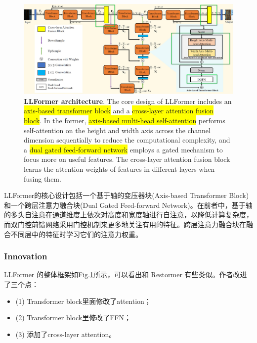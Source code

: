 \documentclass[letterpaper,10pt]{article}
\begin{document}
	\begin{figure}[htbp]
		\centering 
		\includegraphics[width=\columnwidth]{picture/LLFormer_architecture}
		\captionsetup{font=scriptsize}
		\caption{
			\label{fig: LLFormer architecture} %
			\textbf{LLFormer architecture}. The core design of LLFormer includes an \colorbox{yellow}{axis-based transformer block} and a \colorbox{yellow}{cross-layer attention fusion block}. In the former, \colorbox{yellow}{axis-based multi-head self-attention} performs self-attention on the height and width axis across the channel dimension sequentially to reduce the computational complexity, and a \colorbox{yellow}{dual gated feed-forward network} employs a gated mechanism to focus more on useful features. The cross-layer attention fusion block learns the attention weights of features in different layers when fusing them.
			}
	\end{figure}
	LLFormer的核心设计包括一个基于轴的变压器块(Axis-based Transformer Block)和一个跨层注意力融合块(Dual Gated Feed-forward Network)。在前者中，基于轴的多头自注意在通道维度上依次对高度和宽度轴进行自注意，以降低计算复杂度，而双门控前馈网络采用门控机制来更多地关注有用的特征。跨层注意力融合块在融合不同层中的特征时学习它们的注意力权重。
	
	\subsubsection{Innovation}
	
	LLFormer 的整体框架如Fig.\ref{fig: LLFormer architecture}所示，可以看出和 Restormer 有些类似。作者改进了三个点：
	\begin{itemize}
		\item {(1)} Transformer block里面修改了attention；
		\item {(2)} Transformer block里修改了FFN；
		\item {(3)} 添加了cross-layer attention。
	\end{itemize}
	
\end{document}
